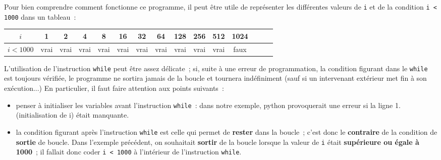 \newpar
Pour bien comprendre comment fonctionne ce programme, il peut être utile de représenter les différentes valeurs de \texttt{i} et de la condition \texttt{i < 1000} dans un tableau~:
\begin{center}
     \begin{tabular}{|c|c|c|c|c|c|c|c|c|c|c|c|c|c|c|}%
          \hline
          $i$ & 1 & 2 & 4 & 8 & 16 & 32 & 64 & 128 & 256 & 512 & 1024
          \\ \hline
          $ i < 1000 $ & vrai & vrai & vrai & vrai & vrai & vrai & vrai & vrai & vrai & vrai & faux
          \\ \hline
     \end{tabular}
\end{center}
L'utilisation de l'instruction \texttt{while} peut être assez délicate~; si, suite à une erreur de programmation, la condition figurant dans le \texttt{while} est toujours vérifiée, le programme ne sortira jamais de la boucle et tournera indéfiniment (sauf si un intervenant extérieur met fin à son exécution...)
\newpar
En particulier, il faut faire attention aux points suivants~:
\begin{itemize}
     \item
     penser à initialiser les variables avant l'instruction \texttt{while}~: dans notre exemple, python provoquerait une erreur si la ligne 1. (initialisation de i) était manquante.
     \item
     la condition figurant après l'instruction \texttt{while} est celle qui permet de \textbf{rester} dans la boucle~; c'est donc le \textbf{contraire} de la condition de \textbf{sortie} de boucle. Dans l'exemple précédent, on souhaitait \textbf{sortir} de la boucle lorsque la valeur de \texttt{i} était \textbf{supérieure ou égale à 1000}~; il fallait donc coder \texttt{i < 1000} à l'intérieur de l'instruction \texttt{while}.
\end{itemize}
